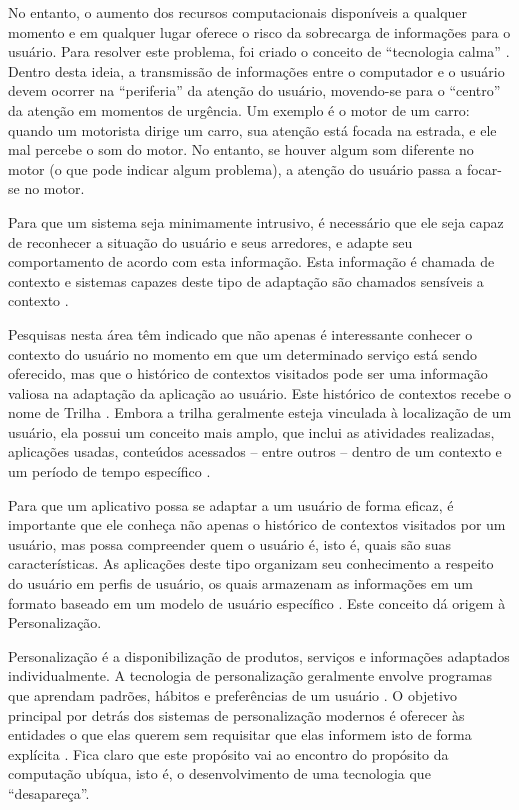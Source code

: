 \documentclass[times, 10pt, twocolumn]{article}
\begin{document}
No entanto, o aumento dos recursos computacionais disponíveis a qualquer momento e em qualquer lugar oferece o risco da sobrecarga de informações para o usuário. Para resolver este problema, foi criado o conceito de ``tecnologia calma'' \cite{weiser96}. Dentro desta ideia, a transmissão de informações entre o computador e o usuário devem ocorrer na ``periferia'' da atenção do usuário, movendo-se para o ``centro'' da atenção em momentos de urgência. Um exemplo é o motor de um carro: quando um motorista dirige um carro, sua atenção está focada na estrada, e ele mal percebe o som do motor. No entanto, se houver algum som diferente no motor (o que pode indicar algum problema), a atenção do usuário passa a focar-se no motor.

Para que um sistema seja minimamente intrusivo, é necessário que ele seja capaz de reconhecer a situação do usuário e seus arredores, e adapte seu comportamento de acordo com esta informação. Esta informação é chamada de contexto e sistemas capazes deste tipo de adaptação são chamados sensíveis a contexto \cite{satyanarayanan01,dey2001}. 

Pesquisas nesta área têm indicado que não apenas é interessante conhecer o contexto do usuário no momento em que um determinado serviço está sendo oferecido, mas que o histórico de contextos visitados pode ser uma informação valiosa na adaptação da aplicação ao usuário. Este histórico de contextos recebe o nome de Trilha \cite{silva10}. Embora a trilha geralmente esteja vinculada à localização de um usuário, ela possui um conceito mais amplo, que inclui as atividades realizadas, aplicações usadas, conteúdos acessados -- entre outros -- dentro de um contexto e um período de tempo específico \cite{silva09}.

Para que um aplicativo possa se adaptar a um usuário de forma eficaz, é importante que ele conheça não apenas o histórico de contextos visitados por um usuário, mas possa compreender quem o usuário é, isto é, quais são suas características. As aplicações deste tipo organizam seu conhecimento a respeito do usuário em perfis de usuário, os quais armazenam as informações em um formato baseado em um modelo de usuário específico \cite{viviani10}. Este conceito dá origem à Personalização.

Personalização é a disponibilização de produtos, serviços e informações adaptados individualmente. A tecnologia de personalização geralmente envolve programas que aprendam padrões, hábitos e preferências de um usuário \cite{mulvenna00}. O objetivo principal por detrás dos sistemas de personalização modernos é oferecer às entidades o que elas querem sem requisitar que elas informem isto de forma explícita \cite{mulvenna00}. Fica claro que este propósito vai ao encontro do propósito da computação ubíqua, isto é, o desenvolvimento de uma tecnologia que ``desapareça''.
\end{document}
